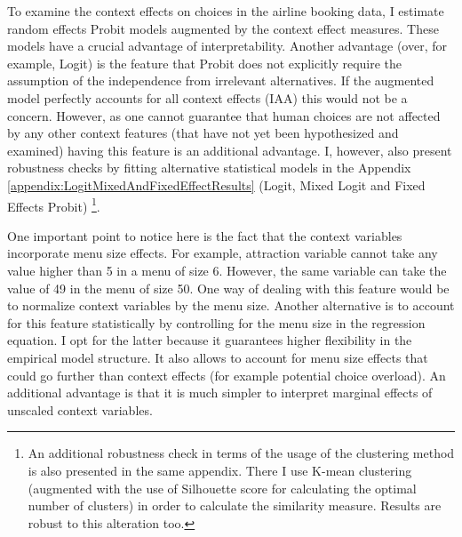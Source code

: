 \documentclass[a4paper,12pt]{article}
\begin{document}
To examine the context effects on choices in the airline booking data, I estimate random effects Probit models augmented by the context effect measures. These models have a crucial advantage of interpretability. Another advantage (over, for example, Logit) is the feature that Probit does not explicitly require the assumption of the independence from irrelevant alternatives. If the augmented model perfectly accounts for all context effects (IAA) this would not be a concern. However, as one cannot guarantee that human choices are not affected by any other context features (that have not yet been hypothesized and examined) having this feature is an additional advantage. I, however, also present robustness checks by fitting alternative statistical models in the Appendix \ref{appendix:LogitMixedAndFixedEffectResults} (Logit, Mixed Logit and Fixed Effects Probit) \footnote{An additional robustness check in terms of the usage of the clustering method is also presented in the same appendix. There I use K-mean clustering (augmented with the use of Silhouette score \citep{rousseeuw1987silhouettes} for calculating the optimal number of clusters) in order to calculate the similarity measure. Results are robust to this alteration too.}.

One important point to notice here is the fact that the context variables incorporate menu size effects. For example, attraction variable cannot take any value higher than 5 in a menu of size 6. However, the same variable can take the value of 49 in the menu of size 50. One way of dealing with this feature would be to normalize context variables by the menu size. Another alternative is to account for this feature statistically by controlling for the menu size in the regression equation. I opt for the latter because it guarantees higher flexibility in the empirical model structure. It also allows to account for menu size effects that could go further than context effects (for example potential choice overload). An additional advantage is that it is much simpler to interpret marginal effects of unscaled context variables.


\clearpage
\end{document}
